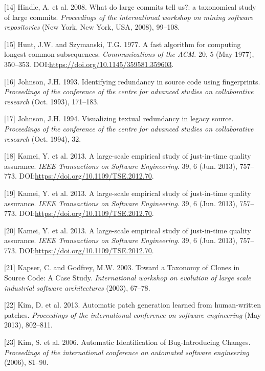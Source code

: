 \documentclass[sigconf]{acmart}
\begin{document}
\hypertarget{ref-Hindle2008}{}
{[}14{]} Hindle, A. et al. 2008. What do large commits tell us?: a
taxonomical study of large commits. \emph{Proceedings of the
international workshop on mining software repositories} (New York, New
York, USA, 2008), 99--108.

\hypertarget{ref-Hunt1977}{}
{[}15{]} Hunt, J.W. and Szymanski, T.G. 1977. A fast algorithm for
computing longest common subsequences. \emph{Communications of the ACM}.
20, 5 (May 1977), 350--353.
DOI:\url{https://doi.org/10.1145/359581.359603}.

\hypertarget{ref-Johnson1993}{}
{[}16{]} Johnson, J.H. 1993. Identifying redundancy in source code using
fingerprints. \emph{Proceedings of the conference of the centre for
advanced studies on collaborative research} (Oct. 1993), 171--183.

\hypertarget{ref-Johnson1994}{}
{[}17{]} Johnson, J.H. 1994. Visualizing textual redundancy in legacy
source. \emph{Proceedings of the conference of the centre for advanced
studies on collaborative research} (Oct. 1994), 32.

\hypertarget{ref-Kamei2013a}{}
{[}18{]} Kamei, Y. et al. 2013. A large-scale empirical study of
just-in-time quality assurance. \emph{IEEE Transactions on Software
Engineering}. 39, 6 (Jun. 2013), 757--773.
DOI:\url{https://doi.org/10.1109/TSE.2012.70}.

\hypertarget{ref-Kamei2013}{}
{[}19{]} Kamei, Y. et al. 2013. A large-scale empirical study of
just-in-time quality assurance. \emph{IEEE Transactions on Software
Engineering}. 39, 6 (Jun. 2013), 757--773.
DOI:\url{https://doi.org/10.1109/TSE.2012.70}.

\hypertarget{ref-Kamei2013b}{}
{[}20{]} Kamei, Y. et al. 2013. A large-scale empirical study of
just-in-time quality assurance. \emph{IEEE Transactions on Software
Engineering}. 39, 6 (Jun. 2013), 757--773.
DOI:\url{https://doi.org/10.1109/TSE.2012.70}.

\hypertarget{ref-CoryKapser}{}
{[}21{]} Kapser, C. and Godfrey, M.W. 2003. Toward a Taxonomy of Clones
in Source Code: A Case Study. \emph{International workshop on evolution
of large scale industrial software architectures} (2003), 67--78.

\hypertarget{ref-Kim2013}{}
{[}22{]} Kim, D. et al. 2013. Automatic patch generation learned from
human-written patches. \emph{Proceedings of the international conference
on software engineering} (May 2013), 802--811.

\hypertarget{ref-Kim2006c}{}
{[}23{]} Kim, S. et al. 2006. Automatic Identification of
Bug-Introducing Changes. \emph{Proceedings of the international
conference on automated software engineering} (2006), 81--90.
\end{document}
